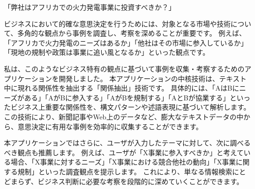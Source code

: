 「弊社はアフリカでの火力発電事業に投資すべきか？」

ビジネスにおいて的確な意思決定を行うためには、対象となる市場や技術について、多角的な観点から事例を調査し、考察を深めることが重要です。
例えば、「アフリカで火力発電のニーズはあるか」「他社はその市場に参入しているか」「現地の規制や政策は事業に追い風となるか」といった観点です。

私は、このようなビジネス特有の観点に基づいて事例を収集・考察するためのアプリケーションを開発しました。
本アプリケーションの中核技術は、テキスト中に現れる関係性を抽出する「関係抽出」技術です。
具体的には、「AはBにニーズがある」「AがBに参入する」「AがBを規制する」「AとBが協業する」といったビジネス上重要な関係性を、構文パターンや述語表現に基づいて解析します。
この技術により、新聞記事やWeb上のデータなど、膨大なテキストデータの中から、意思決定に有用な事例を効率的に収集することができます。

本アプリケーションではさらに、ユーザが入力したテーマに対して、次に調べるべき観点も推薦します。
例えば、ユーザが「X事業に参入すべきか」と考えている場合、「X事業に対するニーズ」「X事業における競合他社の動向」「X事業に関する規制」といった調査観点を提示します。
これにより、単なる情報検索にとどまらず、ビジネス判断に必要な考察を段階的に深めていくことができます。
